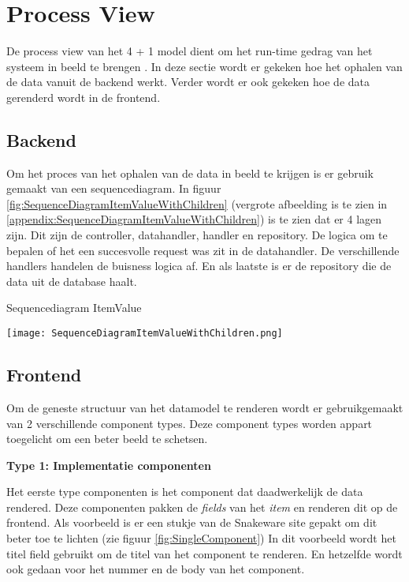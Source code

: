 \section{Process View}
De process view van het 4 + 1 model dient om het run-time gedrag van het systeem in beeld te brengen \parencite{4p1Model}.
In deze sectie wordt er gekeken hoe het ophalen van de data vanuit de backend werkt.
Verder wordt er ook gekeken hoe de data gerenderd wordt in de frontend.

\subsection{Backend}
Om het proces van het ophalen van de data in beeld te krijgen is er gebruik gemaakt van een sequencediagram.
In figuur \ref{fig:SequenceDiagramItemValueWithChildren} (vergrote afbeelding is te zien in \ref{appendix:SequenceDiagramItemValueWithChildren}) is te zien dat er 4 lagen zijn. 
Dit zijn de controller, datahandler, handler en repository.
De logica om te bepalen of het een succesvolle request was zit in de datahandler.
De verschillende handlers handelen de buisness logica af.
En als laatste is er de repository die de data uit de database haalt.

\whitespace
\begin{graphic}
    \captionsetup{type=figure}
    \caption{Sequencediagram ItemValue}
    \texttt{[image: SequenceDiagramItemValueWithChildren.png]}
    \label{fig:SequenceDiagramItemValueWithChildren}
\end{graphic}

\newpage
\subsection{Frontend}
Om de geneste structuur van het datamodel te renderen wordt er gebruikgemaakt van 2 verschillende component types.
Deze component types worden appart toegelicht om een beter beeld te schetsen.

\whitespace[2]
\textbf{Type 1: Implementatie componenten}

\whitespace
Het eerste type componenten is het component dat daadwerkelijk de data rendered.
Deze componenten pakken de \textit{fields} van het \textit{item} en renderen dit op de frontend.
Als voorbeeld is er een stukje van de Snakeware site gepakt om dit beter toe te lichten (zie figuur \ref{fig:SingleComponent})
In dit voorbeeld wordt het titel field  gebruikt om de titel van het component te renderen.
En hetzelfde wordt ook gedaan voor het nummer en de body van het component.

